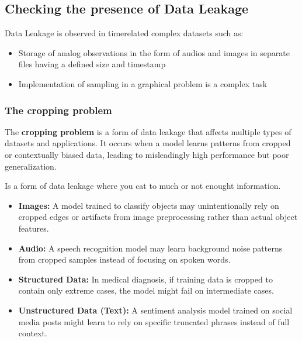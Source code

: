 \subsection{Checking the presence of Data Leakage}
Data Leakage is observed in timerelated complex datasets such as: 
\begin{itemize}
    \item Storage of analog observations in the form of audios and images in separate files having a defined size and timestamp
    \item Implementation of sampling in a graphical problem is a complex task
\end{itemize}


\subsubsection{The cropping problem}
\noindent The \textbf{cropping problem} is a form of data leakage that affects multiple types of datasets and applications. It occurs when a model learns patterns from cropped or contextually biased data, leading to misleadingly high performance but poor generalization.

\noindent Is a form of data leakage where you cat to much or not enought information.

\begin{itemize}
    \item \textbf{Images:} A model trained to classify objects may unintentionally rely on cropped edges or artifacts from image preprocessing rather than actual object features.
    \item \textbf{Audio: } A speech recognition model may learn background noise patterns from cropped samples instead of focusing on spoken words.
    \item \textbf{Structured Data:} In medical diagnosis, if training data is cropped to contain only extreme cases, the model might fail on intermediate cases.
    \item \textbf{Unstructured Data (Text):}  A sentiment analysis model trained on social media posts might learn to rely on specific truncated phrases instead of full context.
\end{itemize}

